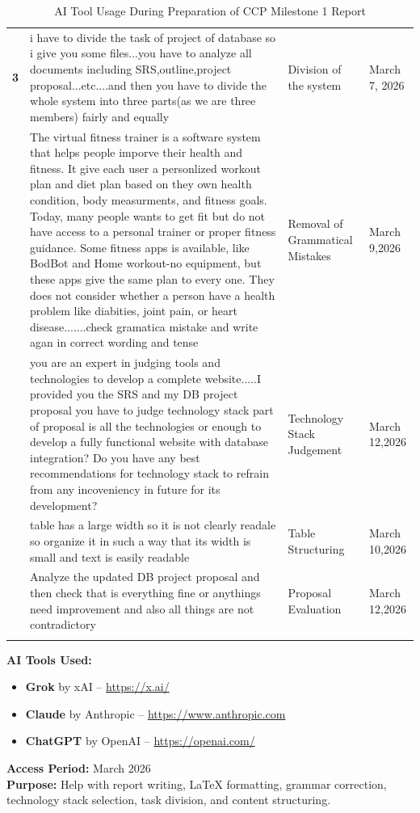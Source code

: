 \documentclass[12pt,a4paper]{article}
\begin{document}
\begin{longtable}{>{\bfseries}p{0.6cm} p{5.5cm} p{5cm} p{2.5cm}}
3 &
i have to divide the task of project of database so i give you some files...you have to analyze all documents including SRS,outline,project proposal...etc....and then you have to divide the whole system into three parts(as we are three members) fairly and equally  &
Division of the system &
March 7, 2026 \\
\addlinespace
4 &
The virtual fitness trainer is a software system that helps people imporve their health
and fitness. It give each user a personlized workout plan and diet plan based on they own
health condition, body measurments, and fitness goals.
Today, many people wants to get fit but do not have access to a personal trainer or proper
fitness guidance. Some fitness apps is available, like BodBot and Home workout-no
equipment, but these apps give the same plan to every one. They does not consider
whether a person have a health problem like diabities, joint pain, or heart disease.......check gramatica mistake and write agan in correct wording and tense &
Removal of Grammatical Mistakes &
March 9,2026 \\
\addlinespace
5 &
you are an expert in judging tools and technologies to develop a complete website.....I provided you the SRS and my DB project proposal you have to judge technology stack part of proposal is all the technologies or enough to develop a fully functional website with database integration? Do you have any best recommendations for technology stack to refrain from any incoveniency in future for its development? &
Technology Stack Judgement &
March 12,2026 \\
\addlinespace
6 &
table has a large width so it is not clearly readale so organize it in such a way that its width is small and text is easily readable &
Table Structuring &
March 10,2026 \\
\addlinespace
7 &
Analyze the updated DB project proposal and then check that is everything fine or anythings need improvement and also all things are not contradictory &
Proposal Evaluation &
March 12,2026 \\
\addlinespace
\bottomrule
\caption{AI Tool Usage During Preparation of CCP Milestone 1 Report}
\end{longtable}

\noindent\textbf{AI Tools Used:}
\begin{itemize}
    \item \textbf{Grok} by xAI -- \url{https://x.ai/}
    \item \textbf{Claude} by Anthropic -- \url{https://www.anthropic.com}
    \item \textbf{ChatGPT} by OpenAI -- \url{https://openai.com/}
\end{itemize}
\noindent\textbf{Access Period:} March 2026\\
\textbf{Purpose:} Help with report writing, LaTeX formatting, grammar correction, technology stack selection, task division, and content structuring.
\end{document}
